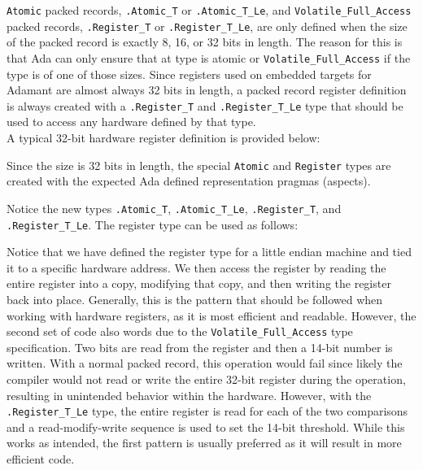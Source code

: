 \texttt{Atomic} packed records, \texttt{.Atomic\_T} or \texttt{.Atomic\_T\_Le}, and \texttt{Volatile\_Full\_Access} packed records, \texttt{.Register\_T} or \texttt{.Register\_T\_Le}, are only defined when the size of the packed record is exactly 8, 16, or 32 bits in length. The reason for this is that Ada can only ensure that at type is atomic or \texttt{Volatile\_Full\_Access} if the type is of one of those sizes. Since registers used on embedded targets for Adamant are almost always 32 bits in length, a packed record register definition is always created with a \texttt{.Register\_T} and \texttt{.Register\_T\_Le} type that should be used to access any hardware defined by that type. \\

A typical 32-bit hardware register definition is provided below:


Since the size is 32 bits in length, the special \texttt{Atomic} and \texttt{Register} types are created with the expected Ada defined representation pragmas (aspects).


Notice the new types \texttt{.Atomic\_T}, \texttt{.Atomic\_T\_Le}, \texttt{.Register\_T}, and \texttt{.Register\_T\_Le}. The register type can be used as follows:


Notice that we have defined the register type for a little endian machine and tied it to a specific hardware address. We then access the register by reading the entire register into a copy, modifying that copy, and then writing the register back into place. Generally, this is the pattern that should be followed when working with hardware registers, as it is most efficient and readable. However, the second set of code also words due to the \texttt{Volatile\_Full\_Access} type specification. Two bits are read from the register and then a 14-bit number is written. With a normal packed record, this operation would fail since likely the compiler would not read or write the entire 32-bit register during the operation, resulting in unintended behavior within the hardware. However, with the \texttt{.Register\_T\_Le} type, the entire register is read for each of the two comparisons and a read-modify-write sequence is used to set the 14-bit threshold. While this works as intended, the first pattern is usually preferred as it will result in more efficient code.

